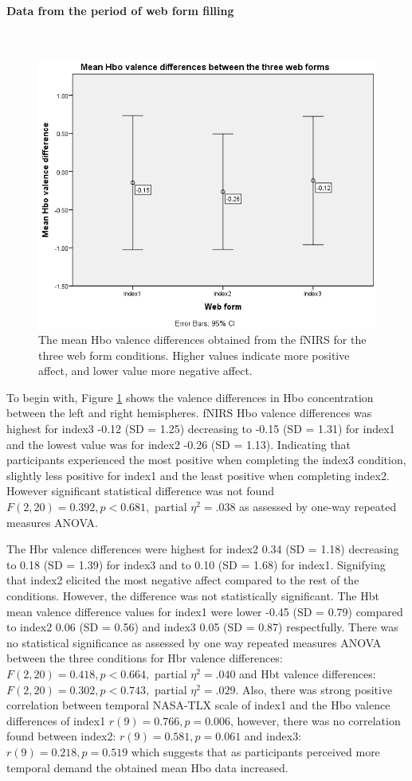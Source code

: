 \documentclass[a4paper]{report}
\begin{document}
			\paragraph{Data from the period of web form filling}\leavevmode\\
				\begin{figure}[h]
					\centering
					\includegraphics[width=0.7\linewidth]{hbo-valence-differences-index123}
					\caption[Hbo valence differences between the three web forms]{The mean Hbo valence differences obtained from the fNIRS for the three web form conditions. Higher values indicate more positive affect, and lower value more negative affect.}
					\label{fig:hbo-valence-differences-index123}
				\end{figure}									
				To begin with, Figure \ref{fig:hbo-valence-differences-index123} shows the valence differences in Hbo concentration between the left and right hemispheres. fNIRS Hbo valence differences was highest for index3 -0.12 (SD = 1.25) decreasing to -0.15 (SD = 1.31) for index1 and the lowest value was for index2 -0.26 (SD = 1.13). Indicating that participants experienced the most positive when completing the index3 condition, slightly less positive for index1 and the least positive when completing index2. However significant statistical difference was not found $F(2,20)=0.392, p<0.681,$ partial $\eta^{2}=.038$ as assessed by one-way repeated measures ANOVA.

				The Hbr valence differences were highest for index2 0.34 (SD = 1.18) decreasing to 0.18 (SD = 1.39) for index3 and to 0.10 (SD = 1.68) for index1. Signifying that index2 elicited the most negative affect compared to the rest of the conditions. However, the difference was not statistically significant.
				The Hbt mean valence difference values for index1 were lower -0.45 (SD = 0.79) compared to index2 0.06 (SD = 0.56) and index3 0.05 (SD = 0.87) respectfully. There was no statistical significance as assessed by one way repeated measures ANOVA between the three conditions for Hbr valence differences: $F(2,20)=0.418, p<0.664,$ partial $\eta^{2}=.040$ and Hbt valence differences: $F(2,20)=0.302, p<0.743,$ partial $\eta^{2}=.029$. Also, there was strong positive correlation between temporal NASA-TLX scale of index1 and the Hbo valence differences of index1 $r(9)=0.766, p=0.006$, however, there was no correlation found between index2: $r(9)=0.581, p=0.061$ and index3: $r(9)=0.218, p=0.519$ which suggests that as participants perceived more temporal demand the obtained mean Hbo data increased.\\
				
\end{document}

